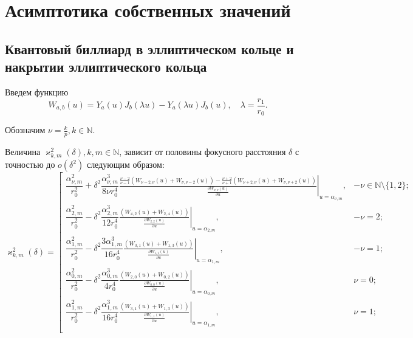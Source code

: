 \chapter{Асимптотика собственных значений}\label{ch:ch2}
\section{Квантовый биллиард в эллиптическом кольце и
накрытии эллиптического кольца}\label{sec:ch2/sec1}
Введем функцию 
\begin{equation}
W_{a, b}(u) = Y_a(u)J_b(\lambda u) - Y_a(\lambda u)J_b(u), \quad \lambda = \frac{r_1}{r_0}. 
\label{eq:YJdef}
\end{equation}

Обозначим $\nu = \frac{k}{p}, k \in \mathbb{N}$. 
\begin{theorem}
	Величина $\varkappa^2_{k,m}(\delta), k, m \in \mathbb{N}$, зависит от половины фокусного расстояния $\delta$ с точностью до $o(\delta^2)$ следующим образом:
{\small
\begin{equation}
\varkappa^2_{k,m}(\delta) = \left[
\begin{array}{cc}
\dfrac{\alpha_{\nu, m}^2}{r_0^2} + \delta^2 \dfrac{\alpha_{\nu, m}^3}{8 \nu r_0^4} \left. \frac{
\frac{\nu-2}{\nu-1}
\left(
W_{\nu-2, \nu}(u) + W_{\nu, \nu-2}(u)
\right)- 
\frac{\nu+2}{\nu+1}
\left(
W_{\nu+2, \nu}(u) + W_{\nu, \nu+2}(u)
\right)
}{ \frac{\partial W_{\nu,\nu}(u)}{\partial u} }\right|_{u=\alpha_{\nu, m}},  & -\nu \in \mathbb{N} \setminus \{1, 2\}; \\

\dfrac{\alpha_{2, m}^2}{r_0^2} - \delta^2 \dfrac{\alpha_{2, m}^3}{12  r_0^4} \left. \frac{
	\left(
	W_{4, 2}(u) + W_{2, 4}(u)
	\right)
}{ \frac{\partial W_{2,2}(u)}{\partial u} }\right|_{u=\alpha_{2, m}}, & -\nu=2; \\

\dfrac{\alpha_{1, m}^2}{r_0^2} - \delta^2 \dfrac{3 \alpha_{1, m}^3 }{16 r_0^4}
\left. \frac{
	\left(
	W_{3, 1}(u) + W_{1, 3}(u)
	\right)
}{ \frac{\partial W_{1,1}(u)}{\partial u} }\right|_{u=\alpha_{1, m}}, & -\nu=1; \\


\dfrac{\alpha_{0, m}^2}{r_0^2} - \delta^2 \dfrac{\alpha_{0, m}^3}{4r_0^4} \left. \frac{
 \left( W_{2, 0}(u) + W_{0, 2}(u) \right)
}{ \frac{\partial W_{0,0}(u)}{\partial u} }\right|_{u=\alpha_{0, m}}, & \nu=0;   \\

\dfrac{\alpha_{1, m}^2}{r_0^2} - \delta^2 \dfrac{\alpha_{1, m}^3}{16 r_0^4} \left. \frac{ \left( W_{3, 1}(u) + W_{1, 3}(u) \right)
}{ \frac{\partial W_{1,1}(u)}{\partial u} }\right|_{u=\alpha_{1, m}},    & \nu=1;\\


\end{array}
\end{equation}}
\end{theorem}

